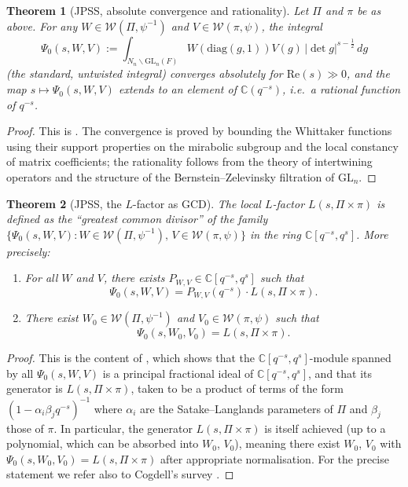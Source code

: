 \documentclass[12pt]{article}
\newtheorem{theorem}{Theorem}
\begin{document}
\begin{theorem}[JPSS, absolute convergence and rationality]\label{thm:JPSS-basic}
Let $\Pi$ and $\pi$ be as above.  For any $W \in \mathcal{W}(\Pi,\psi^{-1})$
and $V \in \mathcal{W}(\pi,\psi)$, the integral
\[
  \Psi_0(s,W,V) := \int_{N_n\backslash \mathrm{GL}_n(F)}
    W\!\left(\mathrm{diag}(g,1)\right) V(g)\,|\det g|^{s-\frac{1}{2}}\,dg
\]
\textup{(}the standard, untwisted integral\textup{)} converges absolutely for
$\mathrm{Re}(s) \gg 0$, and the map $s \mapsto \Psi_0(s,W,V)$ extends to an
element of $\mathbb{C}(q^{-s})$, i.e.\ a rational function of $q^{-s}$.
\end{theorem}

\begin{proof}
This is \cite[Theorem~(2.7)]{JPSS83}.  The convergence is proved by bounding
the Whittaker functions using their support properties on the mirabolic subgroup
and the local constancy of matrix coefficients; the rationality follows from the
theory of intertwining operators and the structure of the Bernstein--Zelevinsky
filtration of $\mathrm{GL}_n$.
\end{proof}

\begin{theorem}[JPSS, the $L$-factor as GCD]\label{thm:JPSS-L}
The local $L$-factor $L(s,\Pi\times\pi)$ is defined as the ``greatest common
divisor'' of the family $\{\Psi_0(s,W,V) : W \in \mathcal{W}(\Pi,\psi^{-1}),\,
V \in \mathcal{W}(\pi,\psi)\}$ in the ring $\mathbb{C}[q^{-s},q^s]$.  More
precisely:
\begin{enumerate}
\item For all $W$ and $V$, there exists $P_{W,V} \in \mathbb{C}[q^{-s},q^s]$
  such that
  \begin{equation}\label{eq:divisibility}
    \Psi_0(s,W,V) = P_{W,V}(q^{-s})\cdot L(s,\Pi\times\pi).
  \end{equation}
\item There exist $W_0 \in \mathcal{W}(\Pi,\psi^{-1})$ and
  $V_0 \in \mathcal{W}(\pi,\psi)$ such that
  \begin{equation}\label{eq:generator}
    \Psi_0(s,W_0,V_0) = L(s,\Pi\times\pi).
  \end{equation}
\end{enumerate}
\end{theorem}

\begin{proof}
This is the content of \cite[Theorem~(2.7) and its proof]{JPSS83}, which shows
that the $\mathbb{C}[q^{-s},q^s]$-module spanned by all $\Psi_0(s,W,V)$ is a
principal fractional ideal of $\mathbb{C}[q^{-s},q^s]$, and that its generator
is $L(s,\Pi\times\pi)$, taken to be a product of terms of the form
$(1 - \alpha_i \beta_j q^{-s})^{-1}$ where $\alpha_i$ are the Satake--Langlands
parameters of $\Pi$ and $\beta_j$ those of $\pi$.  In particular, the generator
$L(s,\Pi\times\pi)$ is itself achieved (up to a polynomial, which can be
absorbed into $W_0$, $V_0$), meaning there exist $W_0$, $V_0$ with
$\Psi_0(s,W_0,V_0) = L(s,\Pi\times\pi)$ after appropriate normalisation.  For
the precise statement we refer also to Cogdell's survey \cite{Cogdell}.
\end{proof}
\end{document}
